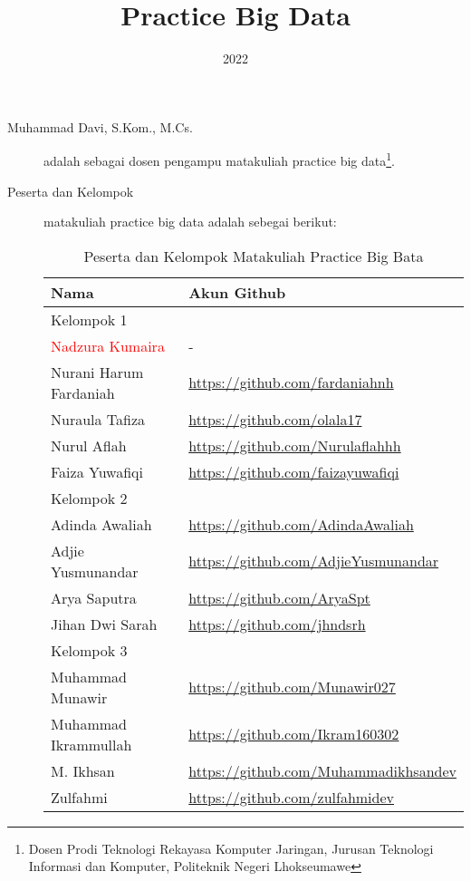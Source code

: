 \documentclass[a4paper]{tufte-handout}
\title{Practice Big Data}
\date{2022}
\begin{document}
\maketitle


\begin{projects}
	\begin{description}
		\item [Muhammad Davi, S.Kom., M.Cs.] adalah sebagai dosen pengampu matakuliah practice big data\footnote{Dosen Prodi Teknologi Rekayasa Komputer Jaringan, Jurusan Teknologi Informasi dan Komputer, Politeknik Negeri Lhokseumawe}.
		\item [Peserta dan Kelompok] matakuliah practice big data adalah sebegai berikut:

\begin{table}[!ht]
\caption{Peserta dan Kelompok Matakuliah Practice Big Bata}
\label{tab:peserta}
\centering
\begin{tabular}{ll} 
\toprule
Nama &	Akun Github\\
\midrule
Kelompok 1\\
\midrule
\textcolor{red}{Nadzura Kumaira}			& - \\
Nurani Harum Fardaniah	& \url{https://github.com/fardaniahnh} \\
Nuraula Tafiza			& \url{https://github.com/olala17} \\
Nurul Aflah				& \url{https://github.com/Nurulaflahhh} \\
Faiza Yuwafiqi			& \url{https://github.com/faizayuwafiqi} \\
\midrule
Kelompok 2\\
\midrule
Adinda Awaliah			& \url{https://github.com/AdindaAwaliah} \\
Adjie Yusmunandar		& \url{https://github.com/AdjieYusmunandar} \\
Arya Saputra			& \url{https://github.com/AryaSpt} \\
Jihan Dwi Sarah			& \url{https://github.com/jhndsrh} \\
\midrule
Kelompok 3\\
\midrule
Muhammad Munawir		& \url{https://github.com/Munawir027} \\
Muhammad Ikrammullah	& \url{https://github.com/Ikram160302} \\
M. Ikhsan				& \url{https://github.com/Muhammadikhsandev} \\
Zulfahmi				& \url{https://github.com/zulfahmidev} \\

\end{tabular}
\end{table}
\end{description}
\end{projects}
\end{document}
